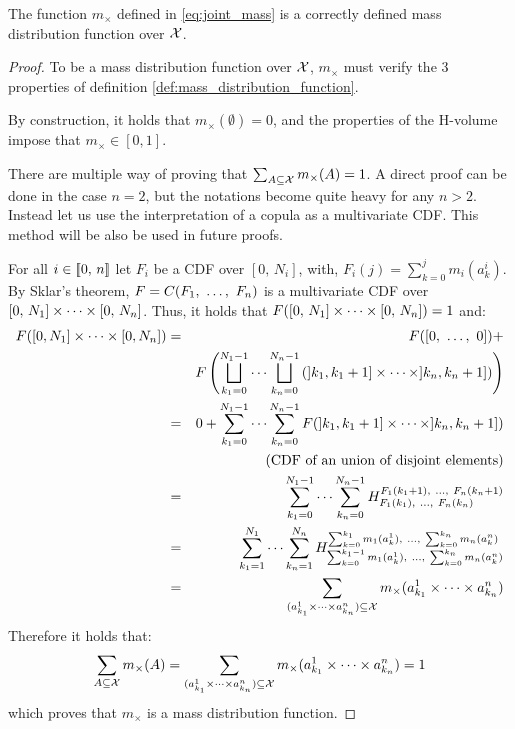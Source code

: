 \begin{proposition}
    The function $m_\times$ defined in \cref{eq:joint_mass} is a correctly defined mass distribution function over $\mathcal{X}$. 
\end{proposition}
\begin{proof}
    To be a mass distribution function over $\mathcal{X}$, $m_\times$ must verify the 3 properties of definition \ref{def:mass_distribution_function}.
    
    By construction, it holds that $m_\times(\emptyset)=0$, and the properties of the H-volume impose that $m_\times\in[0,1]$.
    
    There are multiple way of proving that $\sum_{A\subseteq\mathcal{X}}m_\times(A)=1$. A direct proof can be done in the case $n=2$, but the notations become quite heavy for any $n>2$. Instead let us use the interpretation of a copula as a multivariate CDF. This method will be also be used in future proofs.
    
    For all \(i\in[\![ 0,\, n]\!]\) let $F_i$ be a CDF over $[0,\, N_i]$, with, $F_i(j)=\sum_{k=0}^j m_i(a_k^i)$. By Sklar's theorem, $F=C(F_1 , ~\dots, ~  F_n)$ is a multivariate CDF over $[0,\, N_1]\times\dots\times[0,\, N_n]$. Thus, it holds that $F([0,\, N_1]\times\dots\times[0,\, N_n])=1$ and:
    \begin{eqnarray*}
        F([0, N_1]\times\dots\times[0, N_n]) &=& F([0, ~\dots, ~0])+\\
        &&F\left(\bigsqcup_{k_1=0}^{N_1-1}\dots\bigsqcup_{k_n=0}^{N_n-1}\left(]k_1, k_1+1]\times\dots\times]k_n, k_n+1]\right)\right)\\
        &=& 0 + \sum_{k_1=0}^{N_1-1}\dots\sum_{k_n=0}^{N_n-1} F(]k_1, k_1+1]\times\dots\times]k_n, k_n+1])\\
        && \text{(CDF of an union of disjoint elements)}\\
        &=& \sum_{k_1=0}^{N_1-1}\dots\sum_{k_n=0}^{N_n-1} H_{F_1(k_1) , ~\dots, ~ F_n(k_n)}^{F_1(k_1+1) , ~\dots, ~ F_n(k_n+1)}\\
        &=& \sum_{k_1=1}^{N_1}\dots\sum_{k_n=1}^{N_n} H_{\sum_{k=0}^{k_1-1}m_1(a^1_k) , ~\dots, ~ \sum_{k=0}^{k_n}m_n(a^n_k)}^{\sum_{k=0}^{k_1}m_1(a^1_k) , ~\dots, ~ \sum_{k=0}^{k_n}m_n(a^n_k)}\\
        &=& \sum_{(a^1_{k_1}\times\dots\times a^n_{k_n})\subseteq\mathcal{X}}m_\times(a^1_{k_1}\times\dots\times a^n_{k_n})
    \end{eqnarray*}
Therefore it holds that:
\begin{eqnarray}
    \sum_{A\subseteq\mathcal{X}}m_\times(A)=\sum_{(a^1_{k_1}\times\dots\times a^n_{k_n})\subseteq\mathcal{X}}m_\times(a^1_{k_1}\times\dots\times a^n_{k_n})=1
\end{eqnarray}
which proves that $m_\times$ is a mass distribution function.
\end{proof}

